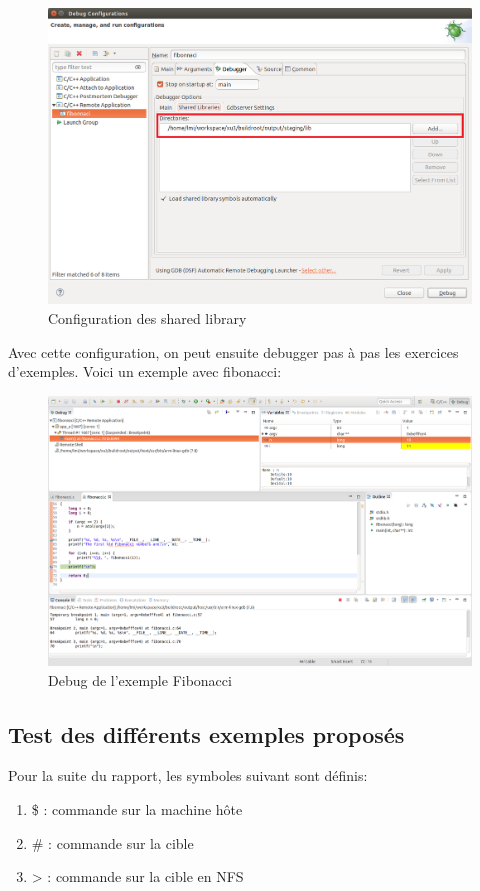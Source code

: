 \begin{figure}[H]
	\begin{center}
		\includegraphics[width=14cm]{img/eclipseConfig4.png}
		\caption{Configuration des shared library}
		\label{eclipseConfig4}
	\end{center}
\end{figure}
Avec cette configuration, on peut ensuite debugger pas à pas les exercices d’exemples. Voici un exemple avec fibonacci:
\begin{figure}[H]
	\begin{center}
		\includegraphics[width=16.5cm]{img/eclipseConfig5.png}
		\caption{Debug de l'exemple Fibonacci}
		\label{eclipseConfig5}
	\end{center}
\end{figure}
\subsection{Test des différents exemples proposés}
Pour la suite du rapport, les symboles suivant sont définis:
\begin{enumerate}
	\item \$ : commande sur la machine hôte
	\item \# : commande sur la cible
	\item > : commande sur la cible en NFS
\end{enumerate}

